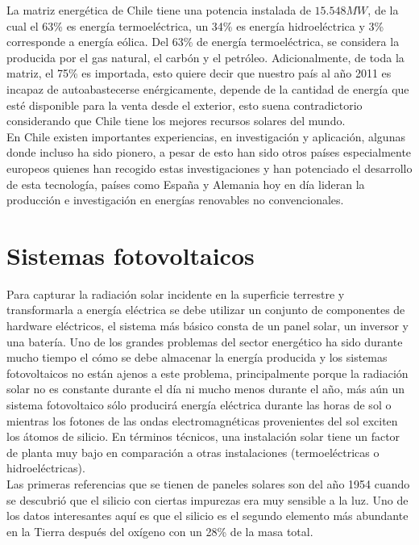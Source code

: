 \newpage
La matriz energética de Chile tiene una potencia instalada de $15.548 MW$\cite{matrizEnergia:1}, de la cual el 63\% es energía termoeléctrica, un 34\% es energía hidroeléctrica y 3\% corresponde a energía eólica. Del 63\% de energía termoeléctrica, se considera la producida por el gas natural, el carbón y el petróleo. Adicionalmente, de toda la matriz, el 75\% es importada, esto quiere decir que nuestro país al año 2011 es incapaz de autoabastecerse enérgicamente, depende de la cantidad de energía que esté disponible para la venta desde el exterior, esto suena contradictorio considerando que Chile tiene los mejores recursos solares del mundo.\\
 
En Chile existen importantes experiencias, en investigación y aplicación, algunas donde incluso ha sido pionero\cite{colegioIng:2}, a pesar de esto han sido otros países especialmente europeos quienes han recogido estas investigaciones y han potenciado el desarrollo de esta tecnología, países como España y Alemania hoy en día lideran la producción e investigación en energías renovables no convencionales.\\

\section{Sistemas fotovoltaicos}
Para capturar la radiación solar incidente en la superficie terrestre y transformarla a energía eléctrica se debe utilizar un conjunto de componentes de hardware eléctricos, el sistema más básico consta de un panel solar, un inversor y una batería. Uno de los grandes problemas del sector energético ha sido durante mucho tiempo el cómo se debe almacenar la energía producida y los sistemas fotovoltaicos no están ajenos a este problema, principalmente porque la radiación solar no es constante durante el día ni mucho menos durante el año, más aún un sistema fotovoltaico sólo producirá energía eléctrica durante las horas de sol o mientras los fotones de las ondas electromagnéticas provenientes del sol exciten los átomos de silicio. En términos técnicos, una instalación solar tiene un factor de planta muy bajo en comparación a otras instalaciones (termoeléctricas o hidroeléctricas).\\

Las primeras referencias que se tienen de paneles solares son del año 1954 cuando se descubrió que el silicio con ciertas impurezas era muy sensible a la luz. Uno de los datos interesantes aquí es que el silicio es el segundo elemento más abundante en la Tierra después del oxígeno con un 28\% de la masa total.\\

